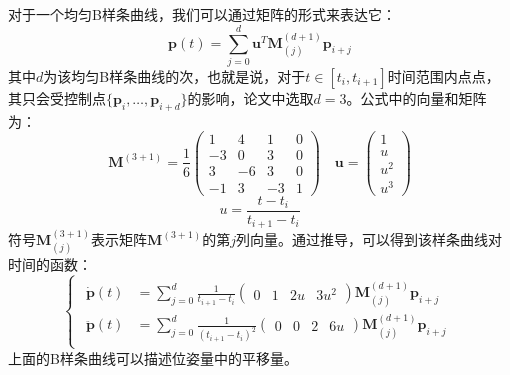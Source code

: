 \documentclass[12pt, twocolumn]{article}
\newcommand{\normf}{\kaishu}
\begin{document}
\section{\normf{论文算法}}
\subsection{\normf{位姿B样条}}
对于一个均匀B样条曲线，我们可以通过矩阵的形式来表达它：
\begin{equation*}
	\boldsymbol{p}(t)=\sum_{j=0}^{d}\boldsymbol{u}^T\boldsymbol{M}^{(d+1)}_{(j)}\boldsymbol{p}_{i+j}
\end{equation*}
其中$d$为该均匀B样条曲线的次，也就是说，对于$t\in [t_i,t_{i+1}]$时间范围内点点，其只会受控制点$\{ \boldsymbol{p}_i,\dots,\boldsymbol{p}_{i+d}\}$的影响，论文中选取$d=3$。公式中的向量和矩阵为：
\begin{equation*}
	\boldsymbol{M}^{(3+1)}=\frac{1}{6}\begin{pmatrix}
		1&4&1&0\\
		-3&0&3&0\\
		3&-6&3&0\\
		-1&3&-3&1
	\end{pmatrix}\quad
\boldsymbol{u}=\begin{pmatrix}
	1\\{u}\\{u}^2\\{u}^3
\end{pmatrix}
\end{equation*}
\begin{equation*}
	u=\frac{t-t_i}{t_{i+1}-t_i}
\end{equation*}
符号$\boldsymbol{M}^{(3+1)}_{(j)}$表示矩阵$\boldsymbol{M}^{(3+1)}$的第$j$列向量。通过推导，可以得到该样条曲线对时间的函数：
\begin{equation*}
	\begin{cases}
		\begin{aligned}
				\dot{\boldsymbol{p}}(t)&=\sum_{j=0}^{d}\frac{1}{t_{i+1}-t_i}\begin{pmatrix}
				0&1&2u&3u^2
			\end{pmatrix}\boldsymbol{M}^{(d+1)}_{(j)}\boldsymbol{p}_{i+j}\\
		\ddot{\boldsymbol{p}}(t)&=\sum_{j=0}^{d}\frac{1}{(t_{i+1}-t_i)^2}\begin{pmatrix}
			0&0&2&6u
		\end{pmatrix}\boldsymbol{M}^{(d+1)}_{(j)}\boldsymbol{p}_{i+j}
		\end{aligned}
	\end{cases}
\end{equation*}
	上面的B样条曲线可以描述位姿量中的平移量。
	
\end{document}
